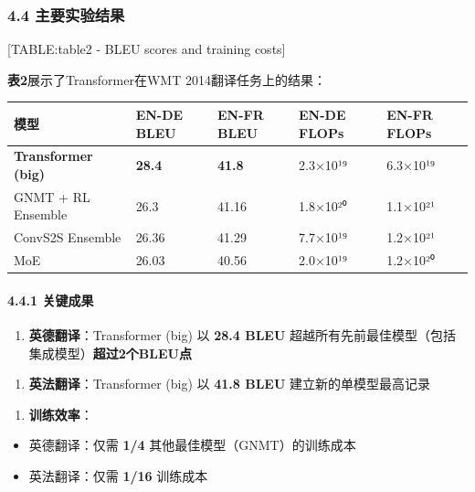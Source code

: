 \documentclass[11pt,a4paper]{article}
\begin{document}
\subsubsection*{4.4 主要实验结果}

[TABLE:table2 - BLEU scores and training costs]

\textbf{表2}展示了Transformer在WMT 2014翻译任务上的结果：

\begin{center}
\begin{tabular}{|l|l|l|l|l|}
\hline
模型 & EN-DE BLEU & EN-FR BLEU & EN-DE FLOPs & EN-FR FLOPs \\
\hline
\textbf{Transformer (big)} & \textbf{28.4} & \textbf{41.8} & 2.3×10¹⁹ & 6.3×10¹⁹ \\
\hline
GNMT + RL Ensemble & 26.3 & 41.16 & 1.8×10²⁰ & 1.1×10²¹ \\
\hline
ConvS2S Ensemble & 26.36 & 41.29 & 7.7×10¹⁹ & 1.2×10²¹ \\
\hline
MoE & 26.03 & 40.56 & 2.0×10¹⁹ & 1.2×10²⁰ \\
\hline
\end{tabular}
\end{center}

\paragraph{4.4.1 关键成果}

\begin{enumerate}
  \item \textbf{英德翻译}：Transformer (big) 以 \textbf{28.4 BLEU} 超越所有先前最佳模型（包括集成模型）\textbf{超过2个BLEU点}
\end{enumerate}

\begin{enumerate}
  \item \textbf{英法翻译}：Transformer (big) 以 \textbf{41.8 BLEU} 建立新的单模型最高记录
\end{enumerate}

\begin{enumerate}
  \item \textbf{训练效率}：
\end{enumerate}
\begin{itemize}
  \item 英德翻译：仅需 \textbf{1/4} 其他最佳模型（GNMT）的训练成本
  \item 英法翻译：仅需 \textbf{1/16} 训练成本
\end{itemize}
\end{document}
